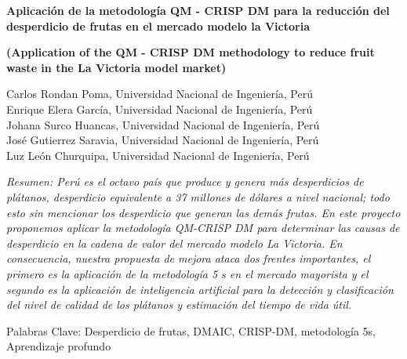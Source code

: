 \documentclass[11pt]{article}
\begin{document}
\begin{center}
    \begin{spacing}{2}
    {\bf\fontsize{19}{21}\selectfont\color{azul} Aplicación de la metodología QM - CRISP DM
para la reducción del desperdicio de frutas en el
mercado modelo la Victoria}
    \end{spacing}
\vspace{1mm}
    {\bf (Application of the QM - CRISP DM methodology to reduce fruit waste in the La Victoria model market)}
    
    
    \vspace{2.5mm}
    {\small Carlos Rondan Poma, Universidad Nacional de Ingeniería, Perú\\
Enrique Elera García, Universidad Nacional de Ingeniería, Perú\\
Johana Surco Huancas, Universidad Nacional de Ingeniería, Perú\\
José Gutierrez Saravia, Universidad Nacional de Ingeniería, Perú\\
Luz León Churquipa, Universidad Nacional de Ingeniería, Perú}
    
\end{center}

\begin{spacing}{0.95}
\footnotesize\noindent\itshape Resumen: Perú es el octavo país que produce y genera más desperdicios de plátanos, desperdicio equivalente a
37 millones de dólares a nivel nacional; todo esto sin mencionar los desperdicio que generan las demás frutas.
En este proyecto proponemos aplicar la metodología QM-CRISP DM para determinar las causas de desperdicio
en la cadena de valor del mercado modelo La Victoria. En consecuencia, nuestra propuesta de mejora ataca dos
frentes importantes, el primero es la aplicación de la metodología 5 s en el mercado mayorista y el segundo es
la aplicación de inteligencia artificial para la detección y clasificación del nivel de calidad de los plátanos y
estimación del tiempo de vida útil.
\vspace{-0.2cm}
\begin{center}
    Palabras Clave: Desperdicio de frutas, DMAIC, CRISP-DM, metodología 5s, Aprendizaje profundo
\end{center}
\end{spacing}
\end{document}
